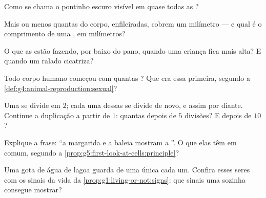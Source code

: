 \begin{exercise}[$\star$]\label{exo:g5:first-look-at-cells:4}
Como se chama o pontinho escuro visível em quase todas as ?
\end{exercise}

\begin{exercise}[$\star$]\label{exo:g5:first-look-at-cells:5}
Mais ou menos quantas  do corpo, enfileiradas, cobrem um
milímetro --- e qual é o comprimento de uma , em milímetros?
\end{exercise}

\begin{exercise}[$\star$]\label{exo:g5:first-look-at-cells:6}
O que as  estão fazendo, por baixo do pano, quando uma criança
fica mais alta? E quando um  ralado cicatriza?
\end{exercise}

\begin{exercise}[$\star$]\label{exo:g5:first-look-at-cells:7}
Todo corpo humano começou com quantas ? Que  era essa
primeira, segundo a \cref{def:g4:animal-reproduction:sexual}?
\end{exercise}

\begin{exercise}[$\star$]\label{exo:g5:first-look-at-cells:8}
Uma  se divide em $2$; cada uma dessas se divide de novo, e
assim por diante. Continue a duplicação a partir de $1$: quantas
 depois de $5$ divisões? E depois de $10$?
\end{exercise}

\begin{exercise}[$\star\star$]\label{exo:g5:first-look-at-cells:9}
Explique a frase: ``a margarida e a baleia mostram a ''. O que elas têm em comum, segundo a
\cref{prop:g5:first-look-at-cells:principle}?
\end{exercise}

\begin{exercise}[$\star\star$]\label{exo:g5:first-look-at-cells:10}
Uma gota de água de lagoa guarda  de uma única 
cada um. Confira esses seres com os sinais da vida da
\cref{prop:g1:living-or-not:signs}: que sinais uma  sozinha
consegue mostrar?
\end{exercise}

